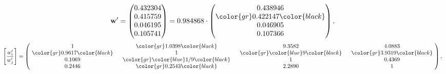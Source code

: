 \begin{example}
\begin{equation*}
\mathbf{w}^{\prime} =
\begin{pmatrix}
0.432304\\
0.415759\\
0.046195\\
0.105741
\end{pmatrix} =
0.984868\cdot
\begin{pmatrix}
0.438946\\
\color{gr} 0.422147\color{black} \\
0.046905\\
0.107366
\end{pmatrix},
\end{equation*}
\begin{equation*}
\left[ \frac{{w}^{\prime}_i}{{w}^{\prime}_j} \right] =
\begin{pmatrix}
$\,\,$ 1 $\,\,$ & $\,\,$\color{gr} 1.0398\color{black} $\,\,$ & $\,\,$9.3582$\,\,$ & $\,\,$4.0883$\,\,$ \\
$\,\,$\color{gr} 0.9617\color{black} $\,\,$ & $\,\,$ 1 $\,\,$ & $\,\,$\color{gr} \color{blue} 9\color{black} $\,\,$ & $\,\,$\color{gr} 3.9319\color{black}   $\,\,$ \\
$\,\,$0.1069$\,\,$ & $\,\,$\color{gr} \color{blue}  1/9\color{black} $\,\,$ & $\,\,$ 1 $\,\,$ & $\,\,$0.4369 $\,\,$ \\
$\,\,$0.2446$\,\,$ & $\,\,$\color{gr} 0.2543\color{black} $\,\,$ & $\,\,$2.2890$\,\,$ & $\,\,$ 1  $\,\,$ \\
\end{pmatrix},
\end{equation*}
\end{example}
\newpage
